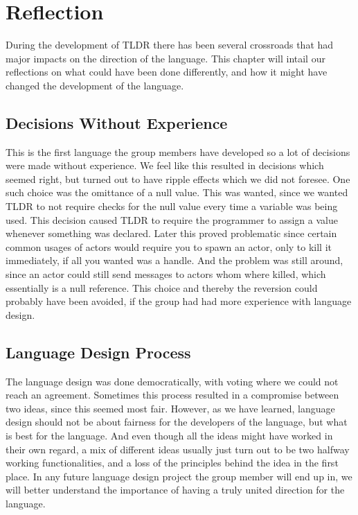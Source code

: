 \chapter{Reflection}\label{chapter:reflection}

During the development of TLDR there has been several crossroads that had major impacts on the direction of the language. This chapter will intail our reflections on what could have been done differently, and how it might have changed the development of the language.

\section{Decisions Without Experience}

This is the first language the group members have developed so a lot of decisions were made without experience. We feel like this resulted in decisions which seemed right, but turned out to have ripple effects which we did not foresee. One such choice was the omittance of a null value. This was wanted, since we wanted TLDR to not require checks for the null value every time a variable was being used. This decision caused TLDR to require the programmer to assign a value whenever something was declared. Later this proved problematic since certain common usages of actors would require you to spawn an actor, only to kill it immediately, if all you wanted was a handle. And the problem was still around, since an actor could still send messages to actors whom where killed, which essentially is a null reference. This choice and thereby the reversion could probably have been avoided, if the group had had more experience with language design.

\section{Language Design Process}

The language design was done democratically, with voting where we could not reach an agreement. Sometimes this process resulted in a compromise between two ideas, since this seemed most fair. However, as we have learned, language design should not be about fairness for the developers of the language, but what is best for the language. And even though all the ideas might have worked in their own regard, a mix of different ideas usually just turn out to be two halfway working functionalities, and a loss of the principles behind the idea in the first place. In any future language design project the group member will end up in, we will better understand the importance of having a truly united direction for the language.

